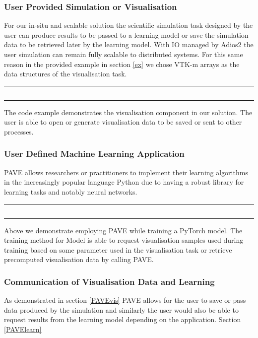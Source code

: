 \documentclass[sigconf,authordraft]{acmart}%
\begin{document}
\subsubsection{User Provided Simulation or Visualisation}

For our in-situ and scalable solution the scientific simulation task designed by the user can produce results to be passed to a learning model or save the simulation data to be retrieved later by the learning model. With IO managed by Adios2 the user simulation can remain fully scalable to distributed systems. For this same reason in the provided example in section \ref{ex} we chose VTK-m arrays as the data structures of the visualisation task.
 
\noindent\rule{0.5\textwidth}{1pt}
\inputminted{python}{pave_pt.py}\label{PAVEvis}
\noindent\rule{0.5\textwidth}{1pt}

The code example  demonstrates the visualisation component in our solution. The user is able to open or generate visualisation data to be saved or sent to other processes. 

\subsubsection{User Defined Machine Learning Application}

PAVE allows researchers or practitioners to implement their learning algorithms in the increasingly popular language Python due to having a robust library for learning tasks and notably neural networks. 

\noindent\rule{0.5\textwidth}{1pt}\label{PAVElearn}
\inputminted{python}{pave.py}
\noindent\rule{0.5\textwidth}{1pt}

Above we demonstrate employing PAVE while training a PyTorch model. The training method for Model is able to request visualisation samples used during training based on some parameter used in the visualisation task or retrieve precomputed visualisation data by calling PAVE.
 
\subsubsection{Communication of Visualisation Data and Learning}

As demonstrated in section \ref{PAVEvis} PAVE allows for the user to save or pass data produced by the simulation and similarly the user would also be able to request results from the learning model depending on the application. Section \ref{PAVElearn}
\end{document}
